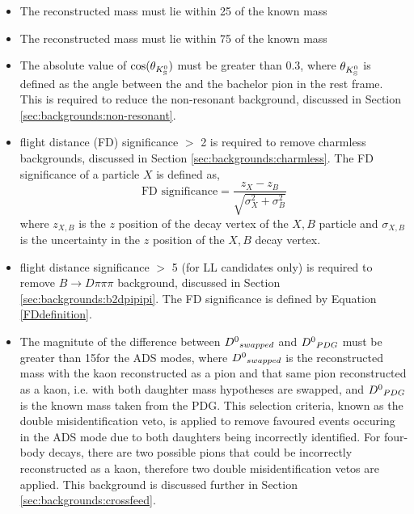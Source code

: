 \begin{itemize}
\item The reconstructed \Dz mass must lie within 25 \mev of the known \Dz mass
\item The reconstructed \Kstarm mass must lie within 75 \mev of the known \Kstarm mass
\item{The absolute value of $\cos(\theta_{{{K}^0_{\mathrm{ \scriptscriptstyle S}}}})$ must be greater than 0.3, where $\theta_{{{K}^0_{\mathrm{ \scriptscriptstyle S}}}}$ is defined as the angle between the \KS and the bachelor pion in the \Kstarm rest frame. This is required to reduce the non-resonant \decay{\Bm}{\D\KS\pim} background, discussed in Section \ref{sec:backgrounds:non-resonant}. }
\item{\Dz flight distance (FD) significance $>$ 2 is required to remove charmless backgrounds, discussed in Section \ref{sec:backgrounds:charmless}. The FD significance of a particle $X$ is defined as, 
\begin{equation}
\text{FD significance} = \frac{z_X - z_B}{\sqrt{\sigma_X^2 + \sigma_B^2}}
\label{FDdefinition}
\end{equation}
where $z_{X,B}$ is the $z$ position of the decay vertex of the $X,B$ particle and $\sigma_{X,B}$ is the uncertainty in the $z$ position of the $X,B$ decay vertex.}
\item{\KS flight distance significance $>$ 5 (for LL candidates only) is required to remove $B \to D\pi\pi\pi$ background, discussed in Section \ref{sec:backgrounds:b2dpipipi}. The \KS FD significance is defined by Equation \ref{FDdefinition}.}
\item{The magnitute of the difference between ${{D}^0}_{swapped}$ and ${{D}^0}_{PDG}$ must be greater than 15\mev for the ADS modes, where ${{D}^0}_{swapped}$ is the reconstructed \Dz mass with the kaon reconstructed as a pion and that same pion reconstructed as a kaon, i.e. with both daughter mass hypotheses are swapped, and ${{D}^0}_{PDG}$ is the known \Dz mass taken from the PDG. This selection criteria, known as the \Dz double misidentification veto, is applied to remove favoured \kpi events occuring in the ADS mode due to both \Dz daughters being incorrectly identified. For four-body \Dz decays, there are two possible pions that could be incorrectly reconstructed as a kaon, therefore two \Dz double misidentification vetos are applied. This background is discussed further in Section \ref{sec:backgrounds:crossfeed}.}
\end{itemize}


